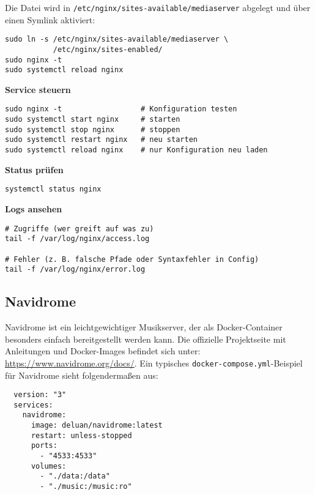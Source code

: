 \documentclass[12pt,a4paper]{report}
\begin{document}
  Die Datei wird in \texttt{/etc/nginx/sites-available/mediaserver} abgelegt 
  und über einen Symlink aktiviert:  

  \begin{verbatim}
sudo ln -s /etc/nginx/sites-available/mediaserver \
           /etc/nginx/sites-enabled/
sudo nginx -t
sudo systemctl reload nginx
  \end{verbatim}  

  \textbf{Service steuern}  
  \begin{verbatim}
sudo nginx -t                  # Konfiguration testen
sudo systemctl start nginx     # starten
sudo systemctl stop nginx      # stoppen
sudo systemctl restart nginx   # neu starten
sudo systemctl reload nginx    # nur Konfiguration neu laden
  \end{verbatim}

  \textbf{Status prüfen}  
  \begin{verbatim}
systemctl status nginx
  \end{verbatim}

  \textbf{Logs ansehen}  
  \begin{verbatim}
# Zugriffe (wer greift auf was zu)
tail -f /var/log/nginx/access.log

# Fehler (z. B. falsche Pfade oder Syntaxfehler in Config)
tail -f /var/log/nginx/error.log
  \end{verbatim}
 
  \subsection{Navidrome}  
  Navidrome ist ein leichtgewichtiger Musikserver, der als Docker-Container besonders einfach bereitgestellt werden kann.  
  Die offizielle Projektseite mit Anleitungen und Docker-Images befindet sich unter: \url{https://www.navidrome.org/docs/}.  
  Ein typisches \texttt{docker-compose.yml}-Beispiel für Navidrome sieht folgendermaßen aus:  
  \begin{verbatim}
  version: "3"
  services:
    navidrome:
      image: deluan/navidrome:latest
      restart: unless-stopped
      ports:
        - "4533:4533"
      volumes:
        - "./data:/data"
        - "./music:/music:ro"
  \end{verbatim} 
\end{document}
